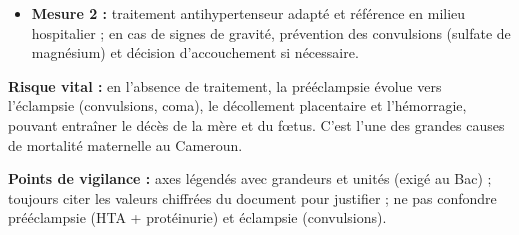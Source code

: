 \documentclass[11pt]{article}
\newcommand{\cle}[1]{{\popxbold\color{popdark}#1}}
\begin{document}
\begin{corrige}
\begin{enumerate}
\begin{itemize}
\item \textbf{Mesure 2 :} traitement antihypertenseur adapté et référence en milieu hospitalier ; en cas de signes de gravité, prévention des convulsions (sulfate de magnésium) et décision d'accouchement si nécessaire.
\end{itemize}
\textbf{Risque vital :} en l'absence de traitement, la prééclampsie évolue vers l'\cle{éclampsie} (convulsions, coma), le décollement placentaire et l'hémorragie, pouvant entraîner le décès de la mère et du fœtus. C'est l'une des grandes causes de mortalité maternelle au Cameroun.
\end{enumerate}
\textbf{Points de vigilance :} axes légendés avec grandeurs et unités (exigé au Bac) ; toujours citer les valeurs chiffrées du document pour justifier ; ne pas confondre prééclampsie (HTA + protéinurie) et éclampsie (convulsions).
\end{corrige}
\end{document}
